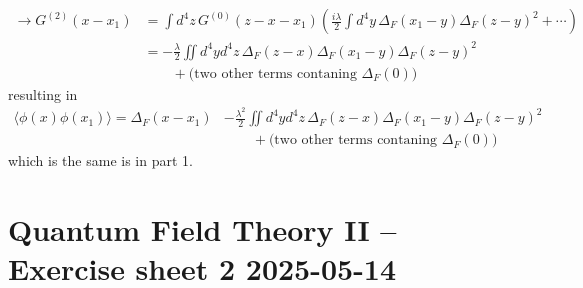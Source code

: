 \documentclass[10pt,a4paper]{article}
\theoremstyle{definition}
\begin{document}
\begin{enumerate}[1.]
\begin{align}
\rightarrow G^{(2)}(x-x_1)
&=\int d^4z\,G^{(0)}(z-x-x_1)\left(\frac{i\lambda}{2}\int d^4y\,\Delta_F(x_1-y)\Delta_F(z-y)^2+\cdots\right)\\
&=-\frac{\lambda}{2}\iint d^4yd^4z \,\Delta_F(z-x)\Delta_F(x_1-y)\Delta_F(z-y)^2\\
&\qquad+\text{(two other terms contaning $\Delta_F(0)$)}
\end{align}
resulting in
\begin{align}
\langle\phi(x)\phi(x_1)\rangle = \Delta_F(x-x_1) &- \frac{\lambda^2}{2}
\iint d^4yd^4z \,\Delta_F(z-x)\Delta_F(x_1-y)\Delta_F(z-y)^2\\
  &\qquad+\text{(two other terms contaning $\Delta_F(0)$)}
\end{align}
which is the same is in part 1.


\end{enumerate}

\newpage
\section{Quantum Field Theory II – Exercise sheet 2 2025-05-14}
\end{document}
